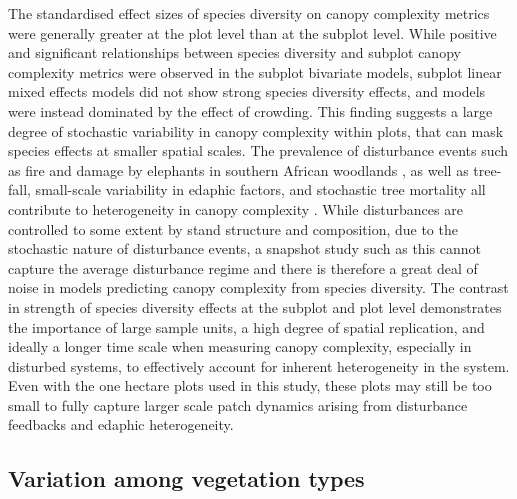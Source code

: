 \begin{refsection}
The standardised effect sizes of species diversity on canopy complexity metrics were generally greater at the plot level than at the subplot level. While positive and significant relationships between species diversity and subplot canopy complexity metrics were observed in the subplot bivariate models, subplot linear mixed effects models did not show strong species diversity effects, and models were instead dominated by the effect of crowding. This finding suggests a large degree of stochastic variability in canopy complexity within plots, that can mask species effects at smaller spatial scales. The prevalence of disturbance events such as fire and damage by elephants in southern African woodlands \citep{Bond2008}, as well as tree-fall, small-scale variability in edaphic factors, and stochastic tree mortality all contribute to heterogeneity in canopy complexity \citep{Shirima2015b}. While disturbances are controlled to some extent by stand structure and composition, due to the stochastic nature of disturbance events, a snapshot study such as this cannot capture the average disturbance regime and there is therefore a great deal of noise in models predicting canopy complexity from species diversity. The contrast in strength of species diversity effects at the subplot and plot level demonstrates the importance of large sample units, a high degree of spatial replication, and ideally a longer time scale when measuring canopy complexity, especially in disturbed systems, to effectively account for inherent heterogeneity in the system. Even with the one hectare plots used in this study, these plots may still be too small to fully capture larger scale patch dynamics arising from disturbance feedbacks and edaphic heterogeneity.

\subsection{Variation among vegetation types}
\label{tls:ssec:veg_type_var}


\end{refsection}
